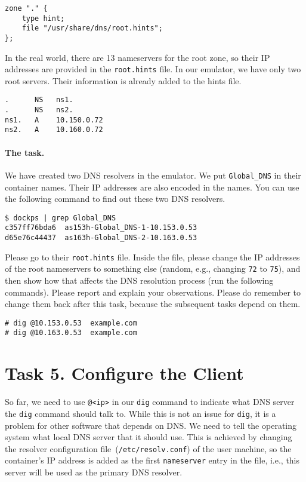 \begin{lstlisting}
zone "." {
	type hint;
	file "/usr/share/dns/root.hints";
};
\end{lstlisting}

In the real world, there are 13 nameservers for the root zone, 
so their IP addresses are provided in the \texttt{root.hints} file. 
In our emulator, we have only two root servers. Their 
information is already added to the hints file. 

\begin{lstlisting}
.      NS   ns1.
.      NS   ns2.
ns1.   A    10.150.0.72
ns2.   A    10.160.0.72
\end{lstlisting}
 


\paragraph{The task.} We have created two DNS resolvers in the emulator. 
We put \texttt{Global\_DNS} in
their container names. Their IP addresses are also encoded in the names.
You can use the following command to find out these two DNS resolvers.

\begin{lstlisting}
$ dockps | grep Global_DNS
c357ff76bda6  as153h-Global_DNS-1-10.153.0.53
d65e76c44437  as163h-Global_DNS-2-10.163.0.53
\end{lstlisting}


Please go to their \texttt{root.hints} file.
Inside the file, please change the IP addresses of the root nameservers 
to something else (random, e.g., changing \texttt{72} to \texttt{75}), 
and then show how that affects
the DNS resolution process (run the following commands). 
Please report and explain your observations. 
Please do remember to change them back after this task,
because the subsequent tasks depend on them.

\begin{lstlisting}
# dig @10.153.0.53  example.com
# dig @10.163.0.53  example.com
\end{lstlisting}
 



\section{Task 5. Configure the Client} 

So far, we need to use \texttt{@<ip>} in our \texttt{dig} command
to indicate what DNS server the \texttt{dig} command should talk to. While this
is not an issue for \texttt{dig}, it is a problem for other software that
depends on DNS.  We need to tell the operating system what local DNS server 
that it should use. 
This is achieved by changing
the resolver configuration file~(\texttt{/etc/resolv.conf}) of the user machine,
so the container's IP address is added as the first \texttt{nameserver} entry in the file, i.e.,
this server will be used as the primary DNS resolver.

